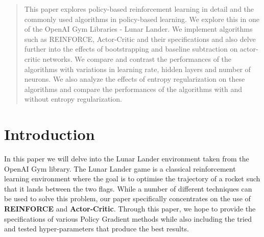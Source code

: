 \documentclass{article}
\begin{document}

\begin{abstract}
This paper explores policy-based reinforcement learning in detail and the commonly used algorithms in policy-based learning. We explore this in one of the OpenAI Gym Libraries - Lunar Lander. We implement algorithms such as REINFORCE, Actor-Critic and their specifications and also delve further into the effects of bootstrapping and baseline subtraction on actor-critic networks. We compare and contrast the performances of the algorithms with variations in learning rate, hidden layers and number of neurons. We also analyze the effects of entropy regularization on these algorithms and compare the performances of the algorithms with and without entropy regularization. 
\end{abstract}

\section {Introduction}
In this paper we will delve into the Lunar Lander environment taken from the OpenAI Gym library. The Lunar Lander game is a classical reinforcement learning environment where the goal is to optimise the trajectory of a rocket such that it lands between the two flags.
 While a number of different techniques can be used to solve this problem, our paper specifically concentrates on the use of  \textbf{REINFORCE} and \textbf{Actor-Critic}. Through this paper, we hope to provide the specifications of various Policy Gradient methods while also including the tried and tested hyper-parameters that produce the best results.%
\end{document}
